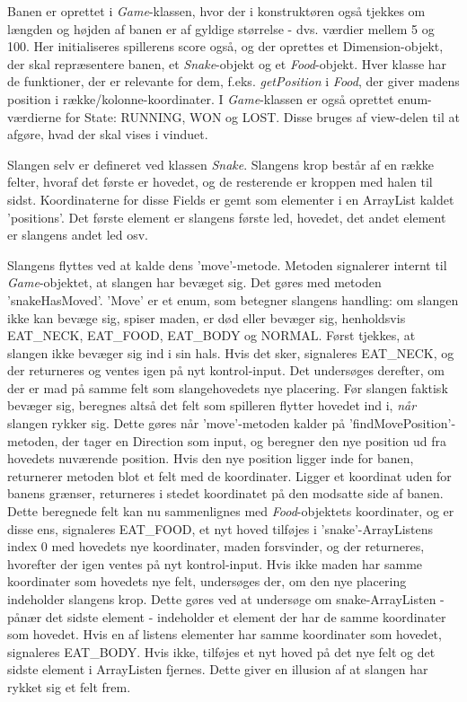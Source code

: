 Banen er oprettet i \textit{Game}-klassen, hvor der i konstruktøren også tjekkes om længden og højden af banen er af gyldige størrelse - dvs. værdier mellem 5 og 100. Her initialiseres spillerens score også, og der oprettes et Dimension-objekt, der skal repræsentere banen, et \textit{Snake}-objekt og et \textit{Food}-objekt. Hver klasse har de funktioner, der er relevante for dem, f.eks. \textit{getPosition} i \textit{Food}, der giver madens position i række/kolonne-koordinater. I \textit{Game}-klassen er også oprettet enum-værdierne for State: RUNNING, WON og LOST. Disse bruges af view-delen til at afgøre, hvad der skal vises i vinduet. 
\newline

Slangen selv er defineret ved klassen \textit{Snake}. Slangens krop består af en række felter, hvoraf det første er hovedet, og de resterende er kroppen med halen til sidst. Koordinaterne for disse Fields er gemt som elementer i en ArrayList kaldet 'positions'. Det første element er slangens første led, hovedet, det andet element er slangens andet led osv.
\newline

Slangens flyttes ved at kalde dens 'move'-metode. Metoden signalerer internt til \textit{Game}-objektet, at slangen har bevæget sig. Det gøres med metoden 'snakeHasMoved'. 'Move' er et enum, som betegner slangens handling: om slangen ikke kan bevæge sig, spiser maden, er død eller bevæger sig, henholdsvis EAT\_NECK, EAT\_FOOD, EAT\_BODY og NORMAL. Først tjekkes, at slangen ikke bevæger sig ind i sin hals. Hvis det sker, signaleres EAT\_NECK, og der returneres og ventes igen på nyt kontrol-input. Det undersøges derefter, om der er mad på samme felt som slangehovedets nye placering. Før slangen faktisk bevæger sig, beregnes altså det felt som spilleren flytter hovedet ind i, \textit{når} slangen rykker sig. Dette gøres når 'move'-metoden kalder på 'findMovePosition'-metoden, der tager en Direction som input, og beregner den nye position ud fra hovedets nuværende position. Hvis den nye position ligger inde for banen, returnerer metoden blot et felt med de koordinater. Ligger et koordinat uden for banens grænser, returneres i stedet koordinatet på den modsatte side af banen.
Dette beregnede felt kan nu sammenlignes med \textit{Food}-objektets koordinater, og er disse ens, signaleres EAT\_FOOD, et nyt hoved tilføjes i 'snake'-ArrayListens index 0 med hovedets nye koordinater, maden forsvinder, og der returneres, hvorefter der igen ventes på nyt kontrol-input. Hvis ikke maden har samme koordinater som hovedets nye felt, undersøges der, om den nye placering indeholder slangens krop. Dette gøres ved at undersøge om snake-ArrayListen - pånær det sidste element - indeholder et element der har de samme koordinater som hovedet. Hvis en af listens elementer har samme koordinater som hovedet, signaleres EAT\_BODY. Hvis ikke, tilføjes et nyt hoved på det nye felt og det sidste element i ArrayListen fjernes. Dette giver en illusion af at slangen har rykket sig et felt frem.
\newline


